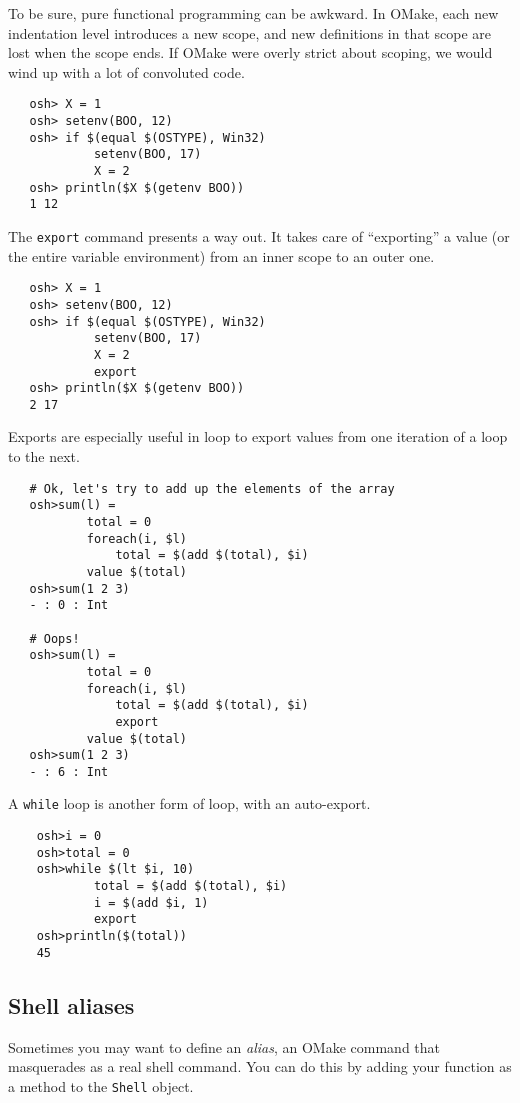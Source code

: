 To be sure, pure functional programming can be awkward.  In OMake, each new indentation level
introduces a new scope, and new definitions in that scope are lost when the scope ends.  If OMake
were overly strict about scoping, we would wind up with a lot of convoluted code.

\begin{verbatim}
   osh> X = 1
   osh> setenv(BOO, 12)
   osh> if $(equal $(OSTYPE), Win32)
            setenv(BOO, 17)
            X = 2
   osh> println($X $(getenv BOO))
   1 12
\end{verbatim}

The \verb+export+ command presents a way out.  It takes care of ``exporting'' a value (or the entire
variable environment) from an inner scope to an outer one.

\begin{verbatim}
   osh> X = 1
   osh> setenv(BOO, 12)
   osh> if $(equal $(OSTYPE), Win32)
            setenv(BOO, 17)
            X = 2
            export
   osh> println($X $(getenv BOO))
   2 17
\end{verbatim}

Exports are especially useful in loop to export values from one iteration of a loop to the next.

\begin{verbatim}
   # Ok, let's try to add up the elements of the array
   osh>sum(l) =
           total = 0
           foreach(i, $l)
               total = $(add $(total), $i)
           value $(total)
   osh>sum(1 2 3)
   - : 0 : Int

   # Oops!
   osh>sum(l) =
           total = 0
           foreach(i, $l)
               total = $(add $(total), $i)
               export
           value $(total)
   osh>sum(1 2 3)
   - : 6 : Int
\end{verbatim}

A \verb+while+ loop is another form of loop, with an auto-export.

\begin{verbatim}
    osh>i = 0
    osh>total = 0
    osh>while $(lt $i, 10)
            total = $(add $(total), $i)
            i = $(add $i, 1)
            export
    osh>println($(total))
    45
\end{verbatim}

\subsection{Shell aliases}

Sometimes you may want to define an \emph{alias}, an OMake command that masquerades as a real shell
command.  You can do this by adding your function as a method to the \verb+Shell+ object.

